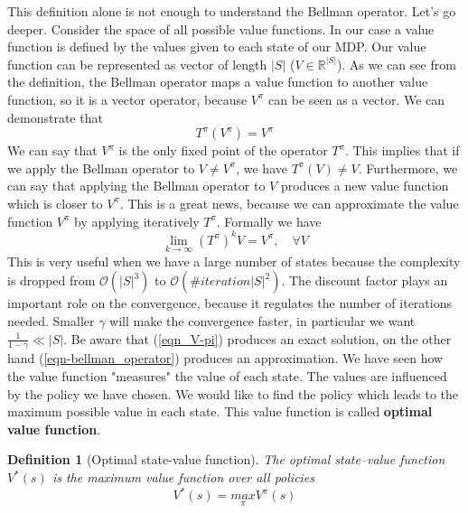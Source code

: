 \documentclass[main.tex]{subfiles}
\newtheorem{definition}{Definition}[section]
\begin{document}
This definition alone is not enough to understand the Bellman operator. Let's go deeper. Consider the space of all possible value functions. In our case a value function is defined by the values given to each state of our MDP. Our value function can be represented as vector of length $|S|$ ($V \in \mathbb{R}^{|S|}$). As we can see from the definition, the Bellman operator maps a value function to another value function, so it is a vector operator, because $V^{\pi}$ can be seen as a vector. We can demonstrate that
\begin{equation}
    T^{\pi}(V^{\pi}) = V^{\pi}
\end{equation}
We can say that $V^{\pi}$ is the only fixed point\footnotemark {} of the operator $T^{\pi}$. This implies that if we apply the Bellman operator to $V \neq V^{\pi}$, we have $T^{\pi}(V) \neq V$. Furthermore, we can say that applying the Bellman operator to $V$ produces a new value function which is closer to $V^{\pi}$. This is a great news, because we can approximate the value function $V^{\pi}$ by applying iteratively $T^{\pi}$. Formally we have
\begin{equation}
    \lim_{k \rightarrow \infty} (T^{\pi})^k V = V^{\pi}, \quad \forall V \label{eqn-bellman_operator}
\end{equation}
This is very useful when we have a large number of states because the complexity is dropped from $\mathcal{O}(|S|^3)$ to $\mathcal{O}(\#iteration|S|^2)$. The discount factor plays an important role on the convergence, because it regulates the number of iterations needed. Smaller $\gamma$ will make the convergence faster, in particular we want $\frac{1}{1-\gamma} \ll |S|$.
Be aware that (\ref{eqn_V-pi}) produces an exact solution, on the other hand (\ref{eqn-bellman_operator}) produces an approximation.
\newline
We have seen how the value function "measures" the value of each state. The values are influenced by the policy we have chosen. We would like to find the policy which leads to the maximum possible value in each state. This value function is called \textbf{optimal value function}.
\begin{definition}[Optimal state-value function]
    The optimal state–value function $V^*(s)$ is the maximum value function over all policies
    \begin{equation}
        V^*(s) = \underset{\pi}{max} V^{\pi}(s)
    \end{equation}
\end{definition}
\end{document}
